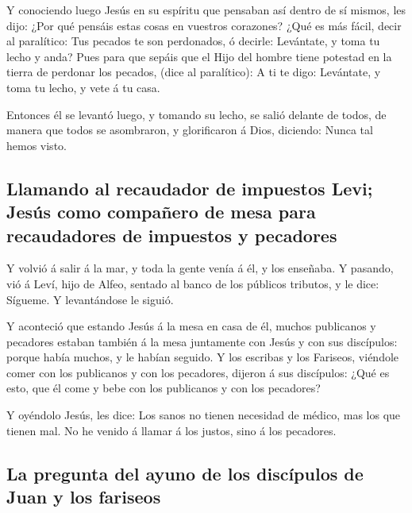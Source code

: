  Y conociendo luego Jesús en su espíritu que pensaban así
dentro de sí mismos, les dijo: ¿Por qué pensáis estas cosas en vuestros
corazones?  ¿Qué es más fácil, decir al paralítico: Tus
pecados te son perdonados, ó decirle: Levántate, y toma tu lecho y anda?
 Pues para que sepáis que el Hijo del hombre tiene
potestad en la tierra de perdonar los pecados, (dice al paralítico):
 A ti te digo: Levántate, y toma tu lecho, y vete á tu
casa.

 Entonces él se levantó luego, y tomando su lecho, se
salió delante de todos, de manera que todos se asombraron, y
glorificaron á Dios, diciendo: Nunca tal hemos visto.

\hypertarget{llamando-al-recaudador-de-impuestos-levi-jesuxfas-como-compauxf1ero-de-mesa-para-recaudadores-de-impuestos-y-pecadores}{%
\subsection{Llamando al recaudador de impuestos Levi; Jesús como
compañero de mesa para recaudadores de impuestos y
pecadores}\label{llamando-al-recaudador-de-impuestos-levi-jesuxfas-como-compauxf1ero-de-mesa-para-recaudadores-de-impuestos-y-pecadores}}

 Y volvió á salir á la mar, y toda la gente venía á él, y
los enseñaba.  Y pasando, vió á Leví, hijo de Alfeo,
sentado al banco de los públicos tributos, y le dice: Sígueme. Y
levantándose le siguió.

 Y aconteció que estando Jesús á la mesa en casa de él,
muchos publicanos y pecadores estaban también á la mesa juntamente con
Jesús y con sus discípulos: porque había muchos, y le habían seguido.
 Y los escribas y los Fariseos, viéndole comer con los
publicanos y con los pecadores, dijeron á sus discípulos: ¿Qué es esto,
que él come y bebe con los publicanos y con los pecadores?

 Y oyéndolo Jesús, les dice: Los sanos no tienen
necesidad de médico, mas los que tienen mal. No he venido á llamar á los
justos, sino á los pecadores.

\hypertarget{la-pregunta-del-ayuno-de-los-discuxedpulos-de-juan-y-los-fariseos}{%
\subsection{La pregunta del ayuno de los discípulos de Juan y los
fariseos}\label{la-pregunta-del-ayuno-de-los-discuxedpulos-de-juan-y-los-fariseos}}


